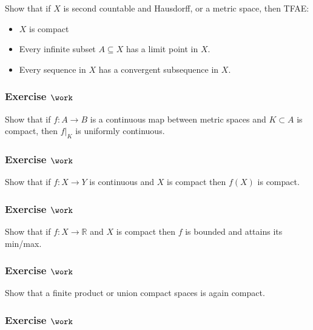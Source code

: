 Show that if \(X\) is second countable and Hausdorff, or a metric space,
then TFAE:

\begin{itemize}
\tightlist
\item
  \(X\) is compact
\item
  Every infinite subset \(A\subseteq X\) has a limit point in \(X\).
\item
  Every sequence in \(X\) has a convergent subsequence in \(X\).
\end{itemize}

\hypertarget{exercise-work-14}{%
\subsubsection{\texorpdfstring{Exercise
\(\work\)}{Exercise \textbackslash work}}\label{exercise-work-14}}

Show that if \(f: A\to B\) is a continuous map between metric spaces and
\(K\subset A\) is compact, then \({\left.{{f}} \right|_{{K}} }\) is
uniformly continuous.

\hypertarget{exercise-work-15}{%
\subsubsection{\texorpdfstring{Exercise
\(\work\)}{Exercise \textbackslash work}}\label{exercise-work-15}}

Show that if \(f:X\to Y\) is continuous and \(X\) is compact then
\(f(X)\) is compact.

\hypertarget{exercise-work-16}{%
\subsubsection{\texorpdfstring{Exercise
\(\work\)}{Exercise \textbackslash work}}\label{exercise-work-16}}

Show that if \(f:X\to {\mathbb{R}}\) and \(X\) is compact then \(f\) is
bounded and attains its min/max.

\hypertarget{exercise-work-17}{%
\subsubsection{\texorpdfstring{Exercise
\(\work\)}{Exercise \textbackslash work}}\label{exercise-work-17}}

Show that a finite product or union compact spaces is again compact.

\hypertarget{exercise-work-18}{%
\subsubsection{\texorpdfstring{Exercise
\(\work\)}{Exercise \textbackslash work}}\label{exercise-work-18}}

